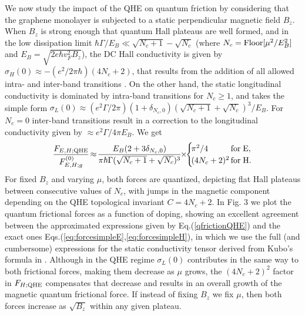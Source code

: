 \documentclass[10pt,aps,prl,superscriptaddress,showpacs,twocolumn]{revtex4-1}
\begin{document}
We now study the impact of the QHE on quantum friction by considering that the graphene monolayer is subjected to a static perpendicular magnetic field $B_z$. 
When $B_z$ is strong enough that quantum Hall plateaus are well formed, and in the low dissipation limit
$\hbar \Gamma /E_B \ll \sqrt{N_c+1} - \sqrt{N_c}$
(where $N_c={\rm Floor}[\mu^2/E_B^2]$ and $E_B=\sqrt{2 e \hbar v_F^2 B_z}$), the DC Hall conductivity is given by $\sigma_H(0) \approx - (e^2/2 \pi \hbar)  (4N_c +2)$, that results from the addition of all allowed intra- and inter-band transitions
\cite{Gusynin2007,Ferreira2012}.
On the other hand, the static longitudinal conductivity is dominated by intra-band transitions for
$N_c \geq 1$, and takes the simple form  $\sigma_L(0) \approx (e^2 \Gamma/2 \pi) (1+\delta_{N_c,0})  (\sqrt{N_c+1}+\sqrt{N_c})^3 / E_B$. For $N_c=0$ inter-band transitions result in a correction to the longitudinal conductivity given by  $\approx e^2 \Gamma/4 \pi E_B$. We get
%
\begin{equation}
\frac{F_{E,H;{\rm QHE}}}{F^{(0)}_{E,H;g}} \! \approx \! \frac{E_B (2 + 3 \delta_{N_c,0})}{\pi \hbar \Gamma (\sqrt{N_c+1}+\sqrt{N_c})^3}
\!\! \times \!\!
\begin{cases}
\! \pi^2/4 & \!\!\!\!\! {\rm for \; E}, \\
\! (4N_c+2)^2 & \!\!\!\!\!{\rm for \; H}. 
\end{cases}
\label{qfrictionQHE}
\end{equation}
For fixed $B_z$ and varying $\mu$, both forces are quantized, depicting flat Hall plateaus between consecutive values of $N_c$, with jumps in the magnetic component depending on the QHE  topological invariant $C=4N_c +2$. In Fig. 3 we plot the quantum frictional forces as a function of doping, showing an excellent agreement between the approximated expressions given by Eq.(\ref{qfrictionQHE}) and the exact ones Eqs.(\ref{eq:forcesimpleE},\ref{eq:forcesimpleH}), in which we use the full (and cumbersome) expressions for the static conductivity tensor derived from Kubo's formula in \cite{Gusynin2007,Ferreira2012}. 
Although in the QHE regime $\sigma_L(0)$ contributes in the same way to both frictional forces, making them decrease as $\mu$ grows, the $(4 N_c+2)^2$ factor in $F_{H;{\rm QHE}}$ compensates that decrease and results in an overall growth of the magnetic quantum frictional force. If instead of fixing $B_z$ we fix $\mu$, then both forces increase as  $\sqrt{B_z}$ within any given plateau.  
\end{document}
